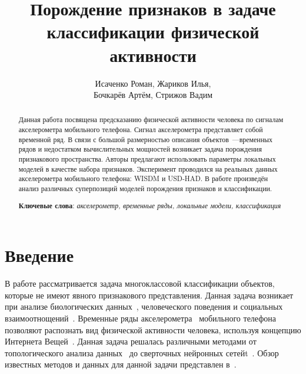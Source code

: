 \documentclass{llncs}
\begin{document}
	
\title{Порождение признаков в задаче классификации физической активности}
%
%
\author{Исаченко Роман, Жариков Илья, \\Бочкарёв Артём, Стрижов Вадим}
%
\authorrunning{} %
%
\tocauthor{}
%

\maketitle              %

\begin{abstract}
	Данная работа посвящена предсказанию физической активности человека по сигналам акселерометра мобильного телефона. 
	Сигнал акселерометра представляет собой временной ряд. 
	В связи с большой размерностью описания объектов~---временных рядов и недостатком вычислительных мощностей возникает задача порождения признакового пространства. 
	Авторы предлагают использовать параметры локальных моделей в качестве набора признаков. 
	Эксперимент проводился на реальных данных акселерометра мобильного телефона: WISDM и USD-HAD.
	В работе произведён анализ различных суперпозиций моделей порождения признаков и классификации.
	
	\bigskip
	\textbf{Ключевые слова}: \emph{акселерометр, временные ряды, локальные модели, классификация}
\end{abstract}

\section{Введение}
В работе рассматривается задача многоклассовой классификации объектов, которые не имеют явного признакового представления.
Данная задача возникает при анализе биологических данных~\cite{motrenko2016extracting}, человеческого поведения и социальных взаимоотнощений~\cite{bao2004activity}. 
Временные ряды акселерометра~\cite{ignatov2016human,lu2016towards,wang2014human} мобильного телефона позволяют распознать вид физической активности человека, используя концепцию Интернета Вещей~\cite{budnik2017learned,lu2016activity}.
Данная задача решалась различными методами от топологического анализа данных~\cite{umeda2017time} до сверточных нейронных сетейt~\cite{hammerla2016deep}. 
Обзор известных методов и данных для данной задачи представлен в~\cite{incel2013review}. 
\end{document}
